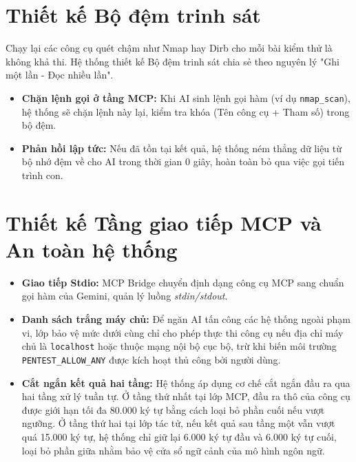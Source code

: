 \section{Thiết kế Bộ đệm trinh sát}
Chạy lại các công cụ quét chậm như Nmap hay Dirb cho mỗi bài kiểm thử là không khả thi. Hệ thống thiết kế Bộ đệm trinh sát chia sẻ theo nguyên lý "Ghi một lần - Đọc nhiều lần".
\begin{itemize}
    \item \textbf{Chặn lệnh gọi ở tầng MCP:} Khi AI sinh lệnh gọi hàm (ví dụ \texttt{nmap\_scan}), hệ thống sẽ chặn lệnh này lại, kiểm tra khóa (Tên công cụ + Tham số) trong bộ đệm.
    \item \textbf{Phản hồi lập tức:} Nếu đã tồn tại kết quả, hệ thống ném thẳng dữ liệu từ bộ nhớ đệm về cho AI trong thời gian 0 giây, hoàn toàn bỏ qua việc gọi tiến trình con.
\end{itemize}

\section{Thiết kế Tầng giao tiếp MCP và An toàn hệ thống}
\begin{itemize}
    \item \textbf{Giao tiếp Stdio:} MCP Bridge chuyển định dạng công cụ MCP sang chuẩn gọi hàm của Gemini, quản lý luồng \textit{stdin/stdout}.
    \item \textbf{Danh sách trắng máy chủ:} Để ngăn AI tấn công các hệ thống ngoài phạm vi, lớp bảo vệ mức dưới cùng chỉ cho phép thực thi công cụ nếu địa chỉ máy chủ là \texttt{localhost} hoặc thuộc mạng nội bộ cục bộ, trừ khi biến môi trường \texttt{PENTEST\_ALLOW\_ANY} được kích hoạt thủ công bởi người dùng.
    \item \textbf{Cắt ngắn kết quả hai tầng:} Hệ thống áp dụng cơ chế cắt ngắn đầu ra qua hai tầng xử lý tuần tự. Ở tầng thứ nhất tại lớp MCP, đầu ra thô của công cụ được giới hạn tối đa 80.000 ký tự bằng cách loại bỏ phần cuối nếu vượt ngưỡng. Ở tầng thứ hai tại lớp tác tử, nếu kết quả sau tầng một vẫn vượt quá 15.000 ký tự, hệ thống chỉ giữ lại 6.000 ký tự đầu và 6.000 ký tự cuối, loại bỏ phần giữa nhằm bảo vệ cửa sổ ngữ cảnh của mô hình ngôn ngữ.
\end{itemize}
